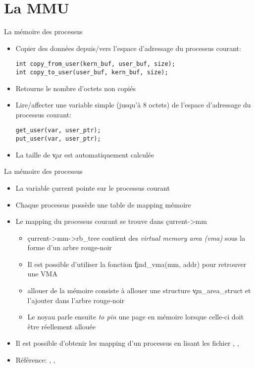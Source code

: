 \section{La MMU}

\begin{frame}[fragile=singleslide]{La mémoire des processus}
  \begin{itemize}
  \item  Copier  des   données  depuis/vers  l'espace  d'adressage  du
    processus courant:
    \begin{lstlisting}
int copy_from_user(kern_buf, user_buf, size);
int copy_to_user(user_buf, kern_buf, size);
    \end{lstlisting}
  \item Retourne le nombre d'octets non copiés
  \item  Lire/affecter  une  variable  simple (jusqu'à  8  octets)  de
    l'espace d'adressage du processus courant:
    \begin{lstlisting}
get_user(var, user_ptr);
put_user(var, user_ptr);
    \end{lstlisting}
  \item  La taille de \c{var} est automatiquement calculée
  \end{itemize}
\end{frame}

\begin{frame}[fragile=singleslide]{La mémoire des processus}
  \begin{itemize}
  \item La variable \c{current} pointe sur le processus courant
  \item Chaque processus possède une table de mapping mémoire
  \item Le mapping du processus courant se trouve dans \c{current->mm}
    \begin{itemize}
    \item  \c{current->mm->rb_tree} contient des  \emph{virtual memory
        area (vma)} sous la forme d'un arbre rouge-noir
    \item     Il    est     possible     d'utiliser    la     fonction
      \c{find_vma(mm, addr)} pour retrouver une VMA
    \item  allouer de  la  mémoire consiste  à  allouer une  structure
      \c{vm_area_struct} et l'ajouter dans l'arbre rouge-noir
    \item Le  noyau parle  ensuite \emph{to pin}  une page  en mémoire
      lorsque celle-ci doit être réellement allouée
    \end{itemize}
  \item Il est possible d'obtenir les mapping d'un processus en lisant
    les   fichier   ,   ,
  \item         Référence:        ,
    , 
  \end{itemize}
\end{frame}

